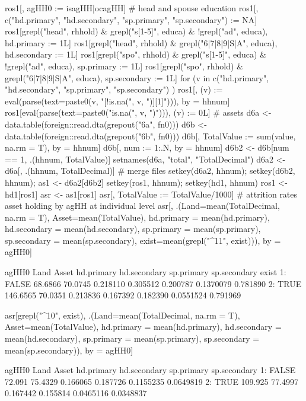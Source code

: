 \begin{Schunk}
\begin{Sinput}
ros1[, agHH0 := isagHH|ocagHH]
# head and spouse education
ros1[, c("hd.primary", "hd.secondary", "sp.primary", "sp.secondary") := NA]
ros1[grepl("head", rhhold) & grepl("s[1-5]", educa) & !grepl("ad", educa), hd.primary := 1L]
ros1[grepl("head", rhhold) & grepl("6|7|8|9|S|A", educa), hd.secondary := 1L]
ros1[grepl("spo", rhhold) & grepl("s[1-5]", educa) & !grepl("ad", educa), sp.primary := 1L]
ros1[grepl("spo", rhhold) & grepl("6|7|8|9|S|A", educa), sp.secondary := 1L]
for (v in c("hd.primary", "hd.secondary", "sp.primary", "sp.secondary") ) {
  ros1[, (v) := eval(parse(text=paste0(v, "[!is.na(", v, ")][1]"))), by = hhnum]
  ros1[eval(parse(text=paste0("is.na(", v, ")"))), (v) := 0L]
}
# assets
d6a <- data.table(foreign::read.dta(grepout("6a", fn0)))
d6b <- data.table(foreign::read.dta(grepout("6b", fn0)))
d6b[, TotalValue := sum(value, na.rm = T), by = hhnum]
d6b[, num := 1:.N, by = hhnum]
d6b2 <- d6b[num == 1, .(hhnum, TotalValue)]
setnames(d6a, "total", "TotalDecimal")
d6a2 <- d6a[, .(hhnum, TotalDecimal)]
# merge files
setkey(d6a2, hhnum); setkey(d6b2, hhnum); 
as1 <- d6a2[d6b2]
setkey(ros1, hhnum); setkey(hd1, hhnum)
ros1 <- hd1[ros1]
asr <- as1[ros1]
asr[, TotalValue := TotalValue/1000]
# attrition rates asset holding by agHH at individual level
asr[, .(Land=mean(TotalDecimal, na.rm = T), Asset=mean(TotalValue), 
  hd.primary = mean(hd.primary), hd.secondary = mean(hd.secondary),
  sp.primary = mean(sp.primary), sp.secondary = mean(sp.secondary),
  exist=mean(grepl("^11", exist))), by = agHH0]
\end{Sinput}
\begin{Soutput}
   agHH0     Land   Asset hd.primary hd.secondary sp.primary sp.secondary    exist
1: FALSE  68.6866 70.0745   0.218110     0.305512   0.200787    0.1370079 0.781890
2:  TRUE 146.6565 70.0351   0.213836     0.167392   0.182390    0.0551524 0.791969
\end{Soutput}
\begin{Sinput}
asr[grepl("^10", exist), .(Land=mean(TotalDecimal, na.rm = T), Asset=mean(TotalValue),
  hd.primary = mean(hd.primary), hd.secondary = mean(hd.secondary),
  sp.primary = mean(sp.primary), sp.secondary = mean(sp.secondary)), 
  by = agHH0]
\end{Sinput}
\begin{Soutput}
   agHH0    Land   Asset hd.primary hd.secondary sp.primary sp.secondary
1: FALSE  72.091 75.4329   0.166065     0.187726  0.1155235    0.0649819
2:  TRUE 109.925 77.4997   0.167442     0.155814  0.0465116    0.0348837
\end{Soutput}

\end{Schunk}
